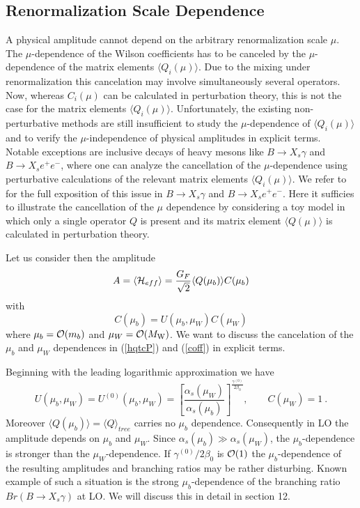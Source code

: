\documentclass[12pt]{article}
\def\as{\alpha_s}
\newcommand{\mw}{M_{\rm W}}
\newcommand{\be}{\begin{equation}}
\newcommand{\ee}{\end{equation}}
\newcommand{\ord}{{\cal O}}
\begin{document}
\begin{itemize}
\begin{itemize}
\subsection{Renormalization Scale Dependence}
A physical amplitude cannot depend on the arbitrary renormalization
scale $\mu$. The $\mu$-dependence of the Wilson coefficients has to
be canceled by the $\mu$-dependence of the matrix elements
$\langle Q_i(\mu)\rangle$. Due to the mixing under renormalization
this cancelation may involve simultaneously several operators.
Now, whereas $C_i(\mu)$ can be calculated in perturbation theory,
this is not the case for the matrix elements $\langle Q_i(\mu)\rangle$.
Unfortunately, the existing non-perturbative methods are still
insufficient to study the $\mu$-dependence of $\langle Q_i(\mu)\rangle$
and to verify the $\mu$-independence of physical amplitudes in explicit
terms. Notable exceptions are inclusive decays of heavy mesons
like $B\to X_s \gamma$ and $B \to X_s e^+e^-$, where one can analyze
the cancellation of the $\mu$-dependence using perturbative calculations
of the relevant matrix elements $\langle Q_i(\mu)\rangle$. We refer
to \cite{BuMu:94,BKP1} for the full exposition of this issue in
$B\to X_s \gamma$ and $B \to X_s e^+e^-$. Here it sufficies to illustrate
the cancellation of the $\mu$ dependence by considering a toy model
in which only a single operator $Q$ is present and its matrix element
$\langle Q(\mu)\rangle$ is calculated in perturbation theory.

Let us consider then the amplitude
\begin{equation}\label{hqtcP}
A=\langle {\cal H}_{eff}\rangle=
{G_F\over\sqrt{2}}
  \langle Q(\mu_b)\rangle C(\mu_b)   
\end{equation}
with
\be\label{coff}
C(\mu_b)=U(\mu_b,\mu_W) C(\mu_W)
\ee
where $\mu_b=\ord(m_b)$ and $\mu_W=\ord(\mw)$.
We want to discuss the cancelation of the $\mu_b$ and $\mu_W$ dependences
in (\ref{hqtcP}) and (\ref{coff}) in explicit terms.

Beginning with the leading logarithmic approximation we have
\begin{equation}\label{B9PP0}
U(\mu_b,\mu_W)=  U^{(0)}(\mu_b,\mu_W) =
\left[\frac{\as(\mu_W)}{\as(\mu_b)}\right]^{\frac{\gamma^{(0)}}{2\beta_0}}, 
\qquad C(\mu_W)=1~.
\end{equation}
Moreover $ \langle Q(\mu_b)\rangle=\langle Q \rangle_{tree} $ carries no
$\mu_b$ dependence.
Consequently in LO the amplitude depends on $\mu_b$ and $\mu_W$.
Since $\as(\mu_b)\gg\as(\mu_W)$, the $\mu_b$-dependence is stronger
than the $\mu_W$-dependence. 
If $\gamma^{(0)}/2\beta_0$ is $\ord(1)$
the $\mu_b$-dependence of the resulting amplitudes and branching ratios 
may be rather
disturbing. Known example of such a situation is the strong 
$\mu_b$-dependence
of the branching ratio $Br(B\to X_s\gamma)$ at LO.
We will discuss this in detail in section 12.


\end{itemize}
\end{itemize}
\end{document}
